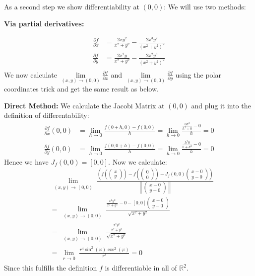 \documentclass[25pt]{sciposter}
\newcommand{\R}{\mathbb{R}}
\newcommand{\norm}[1]{\left\lVert#1\right\rVert}
\begin{document}
\begin{multicols}{3}
As a second step we show differentiability at $(0,0)$: We will use two methods:



\textbf{Via partial derivatives:}

\begin{align*}
\frac{\partial f}{\partial x} &= \frac{2xy^2}{x^2 +y^2} - \frac{2x^3 y^2}{(x^2+y^2)^2}\\
\frac{\partial f}{\partial y} &= \frac{2x^2y}{x^2 +y^2} - \frac{2x^2 y^3}{(x^2+y^2)^2}\\
\end{align*}
We now calculate $\lim\limits_{(x,y)\to(0,0)} \frac{\partial f}{\partial x}$ and  $\lim\limits_{(x,y)\to(0,0)} \frac{\partial f}{\partial y}$ using the polar coordinates trick and get the same result as below. 

\textbf{Direct Method:}
We calculate the Jacobi Matrix at $(0,0)$ and plug it into the definition of differentability:
\begin{align*}
	\frac{\partial f}{\partial x}(0,0) &= \lim\limits_{h \to 0}\frac{f(0+h,0) -f(0,0)}{h} = \lim\limits_{h \to 0} \frac{\frac{0h^2}{h^2 + 0} - 0}{h} = 0\\
	\frac{\partial f}{\partial y}(0,0) &= \lim\limits_{h \to 0}\frac{f(0,0+h) -f(0,0)}{h} = \lim\limits_{h \to 0} \frac{\frac{h^2 0}{0+h^2} - 0}{h} = 0
\end{align*}
Hence we have $J_f (0,0) = \left[0,0\right]$. Now we calculate:
\begin{align*}
&\lim\limits_{\substack{(x,y)\to (0,0)}} \frac{\left(f\left(\begin{pmatrix}
	x \\ y
	\end{pmatrix}\right) -f\left(\begin{pmatrix}
	0 \\ 0
	\end{pmatrix}\right) - J_f(0,0)\begin{pmatrix}
	x-0 \\ y -0
	\end{pmatrix}\right)}{\norm{\begin{pmatrix}
		x -0 \\ y -0
		\end{pmatrix}}} \\
	&= \lim\limits_{\substack{(x,y)\to (0,0)}} \frac{\frac{x^2 y^2}{x^2 + y^2} - 0 - \left[0,0\right] \begin{pmatrix}
x-0 \\ y -0
\end{pmatrix}}{ \sqrt{x^2 + y^2} }\\
&= \lim\limits_{\substack{(x,y)\to (0,0)}} \frac{\frac{x^2 y^2}{x^2 + y^2}}{ \sqrt{x^2 + y^2} }\\
&=  \lim\limits_{\substack{r \to 0}} \frac{r^4 \sin^2(\varphi) \cos^2(\varphi) }{r^3} = 0
\end{align*}
Since this fulfills the definition $f$ is differentiable in all of $\R^2$.



\end{multicols}
\end{document}
